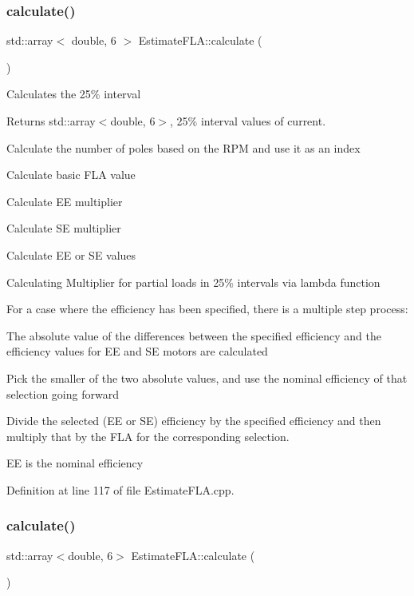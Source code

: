\subsubsection{\texorpdfstring{calculate()}{calculate()}\hspace{0.1cm}{\footnotesize\ttfamily [1/3]}}
{\footnotesize\ttfamily std\+::array$<$ double, 6 $>$ Estimate\+F\+L\+A\+::calculate (\begin{DoxyParamCaption}{ }\end{DoxyParamCaption})}

Calculates the 25\% interval \begin{DoxyReturn}{Returns}
std\+::array$<$double, 6$>$, 25\% interval values of current. 
\end{DoxyReturn}
Calculate the number of poles based on the R\+PM and use it as an index

Calculate basic F\+LA value

Calculate EE multiplier

Calculate SE multiplier

Calculate EE or SE values

Calculating Multiplier for partial loads in 25\% intervals via lambda function

For a case where the efficiency has been specified, there is a multiple step process\+:
\begin{DoxyEnumerate}
\item The absolute value of the differences between the specified efficiency and the efficiency values for EE and SE motors are calculated
\item Pick the smaller of the two absolute values, and use the nominal efficiency of that selection going forward
\item Divide the selected (EE or SE) efficiency by the specified efficiency and then multiply that by the F\+LA for the corresponding selection.
\end{DoxyEnumerate}

EE is the nominal efficiency 

Definition at line 117 of file Estimate\+F\+L\+A.\+cpp.

\mbox{\label{class_estimate_f_l_a_abb1ddcf8de5772322e2e75c8d041f740}} 
\subsubsection{\texorpdfstring{calculate()}{calculate()}\hspace{0.1cm}{\footnotesize\ttfamily [2/3]}}
{\footnotesize\ttfamily std\+::array$<$double, 6$>$ Estimate\+F\+L\+A\+::calculate (\begin{DoxyParamCaption}{ }\end{DoxyParamCaption})}

